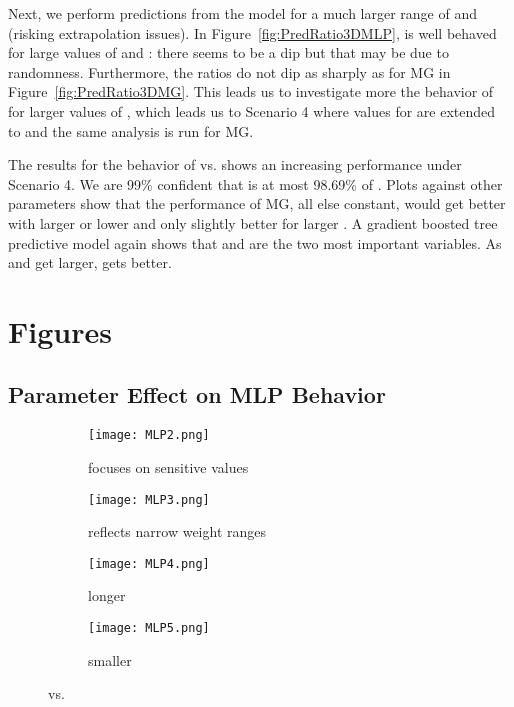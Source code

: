 \documentclass[oribibl]{llncs}
\begin{document}
Next, we perform predictions from the model for a much larger range of  and  (risking extrapolation issues). In Figure~\ref{fig:PredRatio3DMLP},  is well behaved for large values of  and : there seems to be a dip but that may be due to randomness. Furthermore, the ratios do not dip as sharply as for MG in Figure~\ref{fig:PredRatio3DMG}. This leads us to investigate more the behavior of  for larger values of , which leads us to Scenario 4 where values for  are extended to  and the same analysis is run for MG.

The results for the behavior of  vs.  shows an increasing performance under Scenario 4. We are 99\% confident that  is at most 98.69\% of . Plots against other parameters show that the performance of MG, all else constant, would get better with larger  or lower  and only slightly better for larger . A gradient boosted tree predictive model again shows that  and  are the two most important variables. As  and  get larger,  gets better.






\section{Figures}
\label{app:fig}

\subsection {Parameter Effect on MLP Behavior}
\label{app:MLP}
\vspace{-18pt}
\begin{figure*}[h!]\centering

\begin{subfigure}{.45\textwidth}
  \centering
  \texttt{[image: MLP2.png]}
\caption{  focuses on sensitive values}
\label{fig:MLP2}
\end{subfigure}
\hfill
\begin{subfigure}{.45\textwidth}
  \centering
  \texttt{[image: MLP3.png]}
\caption{ reflects narrow weight ranges\\}
\label{fig:MLP3}
\end{subfigure}

\begin{subfigure}{.45\textwidth}
  \centering
  \texttt{[image: MLP4.png]}
  \caption{longer }
  \label{fig:MLP4}
\end{subfigure}
\hfill
\begin{subfigure}{.45\textwidth}
  \centering
  \texttt{[image: MLP5.png]}
  \caption{smaller }
  \label{fig:MLP5}
\end{subfigure}

\caption{ vs. }
\label{fig:MLP2345}
\end{figure*}
\end{document}
